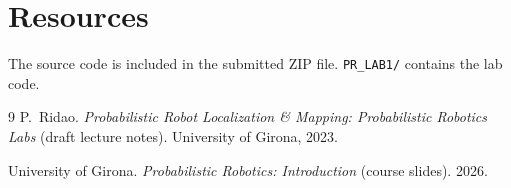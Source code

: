 \documentclass[letterpaper,12pt]{article}
\begin{document}
\section*{Resources}

The source code is included in the submitted ZIP file. \texttt{PR\_LAB1/}
contains the lab code.

\begin{thebibliography}{9}
P.~Ridao.
\emph{Probabilistic Robot Localization \& Mapping: Probabilistic Robotics
Labs} (draft lecture notes).
University of Girona, 2023.

University of Girona.
\emph{Probabilistic Robotics: Introduction} (course slides). 2026.
\end{thebibliography}
\end{document}
